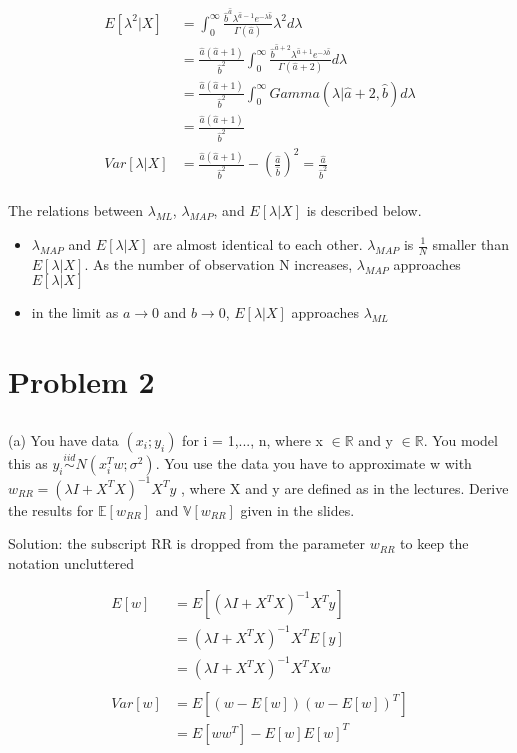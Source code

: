 \documentclass[11pt]{report}
\begin{document}
\begin{equation*}
\begin{split}
E[\lambda^2|X] &= \int^{\infty}_0\frac{ \hat{b}^{\hat{a} } \lambda^{\hat{a} - 1} e^{-\lambda\hat{b}}}{\Gamma(\hat{a})} \lambda^2 d\lambda \\
&= \frac{\hat{a} (\hat{a} + 1)}{\hat{b}^2} \int^{\infty}_0 \frac{\hat{b}^{\hat{a} + 2} \lambda^{\hat{a} + 1} e^{-\lambda \hat{b}} }{\Gamma{(\hat{a} + 2)}} d\lambda \\
&= \frac{\hat{a} (\hat{a} + 1)}{\hat{b}^2} \int^{\infty}_0 Gamma(\lambda|\hat{a} + 2, \hat{b}) d\lambda \\
&= \frac{\hat{a} (\hat{a} + 1)}{\hat{b}^2} \\
Var[\lambda|X] &= \frac{\hat{a} (\hat{a} + 1)}{\hat{b}^2}  - (\frac{\hat{a}}{\hat{b}})^2 = \frac{\hat{a}}{\hat{b}^2}
\end{split} 
\end{equation*}
\\
The relations between $\lambda_{ML}$, $\lambda_{MAP}$, and $E[\lambda|X]$ is described below. 
\begin{itemize}
\item $\lambda_{MAP}$ and $E[\lambda|X]$ are almost identical to each other. $\lambda_{MAP}$ is $\frac{1}{N}$ smaller than $E[\lambda|X]$. As the number of observation N increases, $\lambda_{MAP}$ approaches $E[\lambda|X]$
\item in the limit as $a \xrightarrow{} 0$ and $b \xrightarrow{} 0$, $E[\lambda|X]$ approaches $\lambda_{ML}$
\end{itemize}

\section{Problem 2}
\subsection {}
(a) You have data $(x_i; y_i)$ for i = 1,..., n, where x $\in  \mathbb{R}$ and y $\in \mathbb{R}$. You model this as $y_i \stackrel{iid}{\sim} N(x_i^Tw; \sigma^2)$. You use the data you have to approximate w with $w_{RR}= (\lambda I + X^TX)^{-1}X^T y$ , where X
and y are defined as in the lectures. Derive the results for $\mathbb{E}[w_{RR}]$ and $\mathbb{V}[w_{RR}]$ given in the slides.

\begin{flushleft}
Solution: the subscript RR is dropped from the parameter $w_{RR}$ to keep the notation uncluttered
\end{flushleft}
\begin{equation*}
\begin{split}
E[w] &=  E[(\lambda I + X^TX)^{-1}X^T y] \\
&= (\lambda I + X^TX)^{-1}X^T E[y] \\
&= (\lambda I + X^TX)^{-1}X^TXw \\
\\
Var[w] &=  E[(w - E[w])(w - E[w])^T] \\
&=  E[w w^T] - E[w]E[w]^T \\
\end{split} 
\end{equation*}
\end{document}
